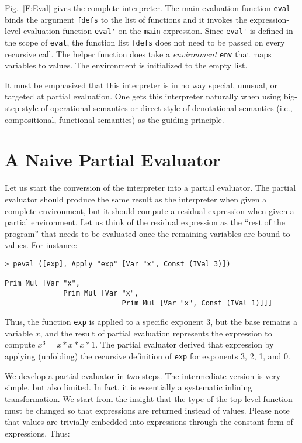 \documentclass{eptcs}
\begin{document}
\noindent
Fig.~\ref{F:Eval} gives the complete interpreter.  The main evaluation
function \lstinline{eval} binds the argument \lstinline{fdefs} to the list
of functions and it invokes the expression-level evaluation function
\lstinline{eval'} on the \lstinline{main} expression. Since
\lstinline{eval'} is defined in the scope of \lstinline{eval}, the
function list \lstinline{fdefs} does not need to be passed on
every recursive call. The helper function does take a
\textit{environment} \lstinline{env} that maps variables to values. The
environment is initialized to the empty list.

It must be emphasized that this interpreter is in no way special,
unusual, or targeted at partial evaluation. One gets this interpreter
naturally when using big-step style of operational semantics or direct
style of denotational semantics (i.e., compositional, functional
semantics) as the guiding principle.


\section{A Naive Partial Evaluator}

Let us start the conversion of the interpreter into a partial
evaluator. The partial evaluator should produce the same result as the
interpreter when given a complete environment, but it should compute a
residual expression when given a partial environment. Let us think of
the residual expression as the ``rest of the program'' that needs to
be evaluated once the remaining variables are bound to values. For
instance:

\begin{lstlisting}
> peval ([exp], Apply "exp" [Var "x", Const (IVal 3)])

Prim Mul [Var "x", 
              Prim Mul [Var "x",
                            Prim Mul [Var "x", Const (IVal 1)]]]
\end{lstlisting}

\noindent
Thus, the function \lstinline{exp} is applied to a specific exponent
$3$, but the base remains a variable $x$, and the result of partial
evaluation represents the expression to compute $x^3 = x*x*x*1$. The
partial evaluator derived that expression by applying (unfolding) the
recursive definition of \lstinline{exp} for exponents 3, 2, 1, and 0.

We develop a partial evaluator in two steps. The intermediate version
is very simple, but also limited. In fact, it is essentially a
systematic inlining transformation. We start from the insight that
the type of the top-level function must be changed so that expressions
are returned instead of values. Please note that values are trivially
embedded into expressions through the constant form of
expressions. Thus:
\end{document}
